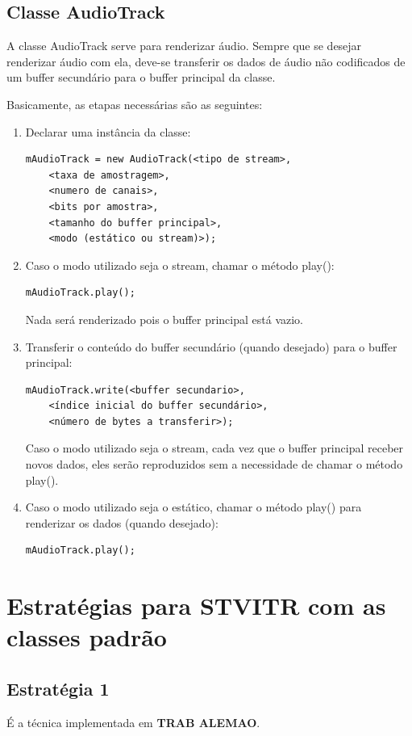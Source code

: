 \documentclass{acm_proc_article-sp}
\newcommand{\todo}[1]{\textcolor[rgb]{1.00,0.00,0.00}{\bf \uppercase{#1}}}
\begin{document}
\subsection{Classe AudioTrack}
A classe AudioTrack serve para renderizar áudio. Sempre que se desejar renderizar áudio com ela, deve-se transferir os dados de áudio não codificados de um buffer secundário para o buffer principal da classe.

Basicamente, as etapas necessárias são as seguintes:
\begin{enumerate}
 \item Declarar uma instância da classe:
  \begin{verbatim}
mAudioTrack = new AudioTrack(<tipo de stream>,
    <taxa de amostragem>,
    <numero de canais>,
    <bits por amostra>,
    <tamanho do buffer principal>,
    <modo (estático ou stream)>);
  \end{verbatim}
 \item Caso o modo utilizado seja o stream, chamar o método play():
  \begin{verbatim}
mAudioTrack.play();
  \end{verbatim}
  Nada será renderizado pois o buffer principal está vazio.
 \item Transferir o conteúdo do buffer secundário (quando desejado) para o buffer principal:
  \begin{verbatim}
mAudioTrack.write(<buffer secundario>,
    <índice inicial do buffer secundário>,
    <número de bytes a transferir>);
  \end{verbatim}
Caso o modo utilizado seja o stream, cada vez que o buffer principal receber novos dados, eles serão reproduzidos sem a necessidade de chamar o método play().
 \item Caso o modo utilizado seja o estático, chamar o método play() para renderizar os dados (quando desejado):
  \begin{verbatim}
mAudioTrack.play();
  \end{verbatim}
\end{enumerate}

\section{Estratégias para STVITR com as classes padrão}

\subsection{Estratégia 1}
É a técnica implementada em \todo{trab alemao}.
\end{document}
